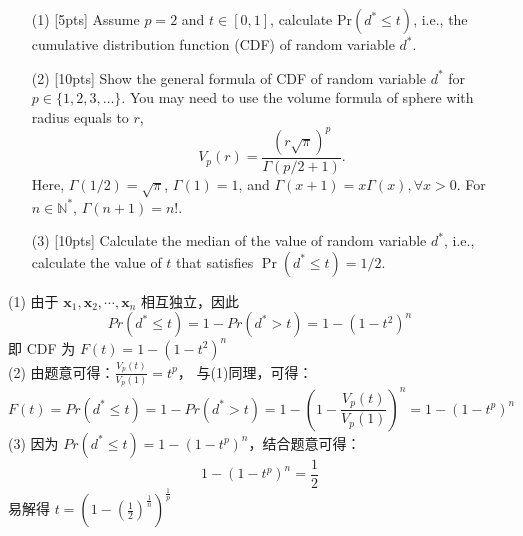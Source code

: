 \documentclass{article}
\begin{document}
	\begin{enumerate}
		\item [(1)] [5pts] Assume $ p = 2 $ and $ t \in [0, 1]$, calculate Pr$(d^* \leq t)$, i.e., the cumulative distribution function (CDF) of random variable $d^*$.
		\item [(2)] [10pts] Show the general formula of CDF of random variable $d^*$ for $p \in \{1, 2, 3, \dots \}$. You may need to use the volume formula of sphere with radius equals to $r$,
				\begin{equation}
				V_{p}(r)=\frac{(r \sqrt{\pi})^{p}}{\Gamma(p / 2+1)}.
				\end{equation}
				Here, $\Gamma(1 / 2)=\sqrt{\pi}$, $\Gamma(1)=1$, and $\Gamma(x+1)=x \Gamma(x), \forall x > 0$. For $n \in \mathbb{N}^*$, $\Gamma(n+1)=n!$.
		\item [(3)] [10pts] Calculate the median of the value of random variable $d^*$, i.e., calculate the value of $t$ that satisfies $\operatorname{Pr}\left(d^{*} \leq t\right)=1 / 2$.
	\end{enumerate}
(1) 由于 $\mathbf{x}_1, \mathbf{x}_2, \cdots, \mathbf{x}_n$ 相互独立，因此
\begin{equation}
Pr(d^* \leq t) = 1 - Pr(d^* > t) = 1 - (1 - t^2)^n
\end{equation}
即 CDF 为 $F(t) = 1 - (1 - t^2)^n$ \\
(2) 由题意可得：$\frac{V_p(t)}{V_p(1)} = t^p$，
与(1)同理，可得：
\begin{equation}
F(t) = Pr(d^* \leq t) = 1 - Pr(d^* > t) = 1 - \left(1 - \frac{V_p(t)}{V_p(1)}\right)^n = 1 - (1 - t^p)^n
\end{equation}
(3) 因为 $Pr(d^* \leq t) = 1 - (1 - t^p)^n$，结合题意可得：
\begin{equation}
1 - (1 - t^p)^n = \frac{1}{2}
\end{equation}
易解得 $t = (1 - (\frac{1}{2})^{\frac{1}{n}})^{\frac{1}{p}}$

\newpage
	
	
\end{document}
